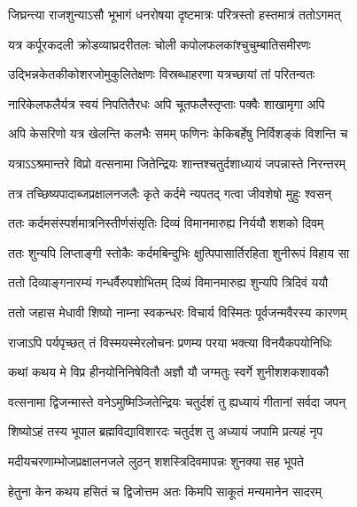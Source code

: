 \twolineshloka
{जिघ्रन्त्या राजशुन्याऽसौ भूभागं धनरोषया}
{दृष्टमात्रः परित्रस्तो हस्तमात्रं ततोऽगमत्} %

\twolineshloka
{यत्र कर्पूरकदली क्रोडव्याघ्रदरीतलः}
{चोली कपोलफलकांश्चुचुम्बातिसमीरणः} %

\twolineshloka
{उद्भिन्नकेतकीकोशरजोमुकुलितेक्षणः}
{विस्रब्धाहरणा यत्रच्छायां तां परितन्वतः} %

\twolineshloka
{नारिकेलफलैर्यत्र स्वयं निपतितैरधः}
{अपि चूतफलैस्तृप्ताः पक्वैः शाखामृगा अपि} %

\twolineshloka
{अपि केसरिणो यत्र खेलन्ति कलभैः समम्}
{फणिनः केकिबर्हेषु निर्विशङ्कं विशन्ति च} %

\twolineshloka
{यत्राऽऽश्रमान्तरे विप्रो वत्सनामा जितेन्द्रियः}
{शान्तश्चतुर्दशाध्यायं जपन्नास्ते निरन्तरम्} %

\twolineshloka
{तत्र तच्छिष्यपादाब्जप्रक्षालनजलैः कृते}
{कर्दमे न्यपतद् गत्वा जीवशेषो मुहुः श्वसन्} %

\twolineshloka
{ततः कर्दमसंस्पर्शमात्रनिस्तीर्णसंसृतिः}
{दिव्यं विमानमारुह्य निर्ययौ शशको दिवम्} %

\twolineshloka
{ततः शुन्यपि लिप्ताङ्गी स्तोकैः कर्दमबिन्दुभिः}
{क्षुत्पिपासार्तिरहिता शुनीरूपं विहाय सा} %

\twolineshloka
{ततो दिव्याङ्गनारम्यं गन्धर्वैरुपशोभितम्}
{दिव्यं विमानमारुह्य शुन्यपि त्रिदिवं ययौ} %

\twolineshloka
{ततो जहास मेधावी शिष्यो नाम्ना स्वकन्धरः}
{विचार्य विस्मितः पूर्वजन्मवैरस्य कारणम्} %

\twolineshloka
{राजाऽपि पर्यपृच्छत् तं विस्मयस्मेरलोचनः}
{प्रणम्य परया भक्त्या विनयैकपयोनिधिः} %

\twolineshloka
{कथां कथय मे विप्र हीनयोनिनिषेवितौ}
{अज्ञौ यौ जग्मतुः स्वर्गे शुनीशशकशावकौ} %


\twolineshloka
{वत्सनामा द्विजन्मास्ते वनेऽमुष्मिञ्जितेन्द्रियः}
{चतुर्दशं तु ह्यध्यायं गीतानां सर्वदा जपन्} %

\twolineshloka
{शिष्योऽहं तस्य भूपाल ब्रह्मविद्याविशारदः}
{चतुर्दश तु अध्यायं जपामि प्रत्यहं नृप} %

\twolineshloka
{मदीयचरणाम्भोजप्रक्षालनजले लुठन्}
{शशस्त्रिदिवमापन्नः शुनक्या सह भूपते} %


\twolineshloka
{हेतुना केन कथय हसितं च द्विजोत्तम}
{अतः किमपि साकूतं मन्यमानेन सादरम्} %


